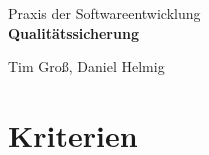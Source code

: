 \documentclass[parskip=full]{scrartcl}
\begin{document}
	\begin{titlepage}
		
		\centering
		\vspace*{0.2\textheight}
		{\Large Praxis der Softwareentwicklung}\\[\baselineskip]
		\vspace{2cm}
		{\Huge \textbf{Qualitätssicherung}}\\[\baselineskip]\par
		\vspace{2cm}
		{\LARGE Tim Groß, Daniel Helmig}\par		
		\newpage	
		\tableofcontents
		\pagebreak
		
	\end{titlepage}
	\section{Kriterien}
\end{document}
